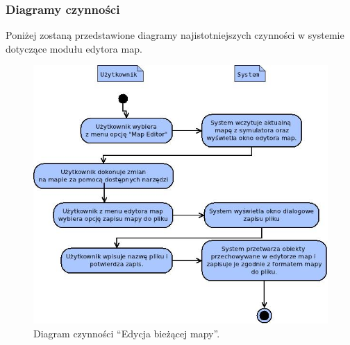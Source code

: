 \subsubsection{Diagramy czynności}
\begin{par}
		Poniżej zostaną przedstawione diagramy najistotniejszych czynności w systemie dotyczące modułu edytora map.
		\begin{figure}[!h]
		\centering
		\includegraphics[width=\textwidth]{obrazki/czynnosci_edytor_map.jpeg}
		\caption{Diagram czynności ``Edycja bieżącej mapy''.}
		\label{fig:czynn_edytor_map}
		\end{figure}
		\FloatBarrier
\end{par}

